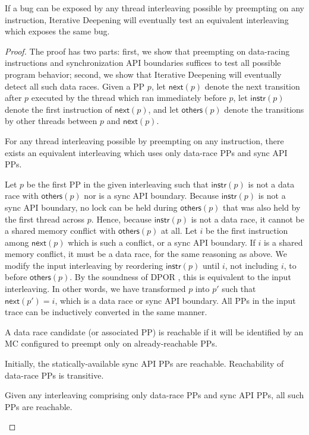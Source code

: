 \begin{theorem}
If a bug can be exposed by any thread interleaving possible by preempting on any instruction,
Iterative Deepening will eventually test an equivalent interleaving which exposes the same bug.
\end{theorem}
\begin{proof}
The proof has two parts:
first, we show that preempting on data-racing instructions and synchronization API boundaries suffices to test all possible program behavior;
second, we show that Iterative Deepening will eventually detect all such data races.
\newcommand\ppnext[1]{\ensuremath{\mathsf{next}(#1)}}
\newcommand\ppinstr[1]{\ensuremath{\mathsf{instr}(#1)}}
\newcommand\ppothers[1]{\ensuremath{\mathsf{others}(#1)}}
Given a PP $p$, let $\ppnext{p}$ denote the next transition after $p$ executed by the thread which ran immediately before $p$,
let $\ppinstr{p}$ denote the first instruction of $\ppnext{p}$,
and let $\ppothers{p}$ denote the transitions by other threads between $p$ and $\ppnext{p}$.

\begin{lemma}
For any thread interleaving possible by preempting on any instruction,
there exists an equivalent interleaving which uses only data-race PPs and sync API PPs.
	\label{lem:relevant}
\end{lemma}

Let $p$ be the first PP in the given interleaving such that $\ppinstr{p}$ is not a data race with $\ppothers{p}$ nor is a sync API boundary.
Because $\ppinstr{p}$ is not a sync API boundary,
no lock can be held during $\ppothers{p}$ that was also held by the first thread across $p$.
Hence, because $\ppinstr{p}$ is not a data race, it cannot be a shared memory conflict with $\ppothers{p}$ at all.
Let $i$ be the first instruction among $\ppnext{p}$ which is such a conflict, or a sync API boundary.
If $i$ is a shared memory conflict, it must be a data race, for the same reasoning as above.
We modify the input interleaving by reordering $\ppinstr{p}$ until $i$, not including $i$, to before $\ppothers{p}$.
By the soundness of DPOR \cite{dpor}, this is equivalent to the input interleaving.
In other words, we have transformed $p$ into $p'$ such that $\ppnext{p'} = i$, which is a data race or sync API boundary.
All PPs in the input trace can be inductively converted in the same manner.

\begin{definition}
A data race candidate (or associated PP) is reachable if it will be identified by an MC configured to preempt only on already-reachable PPs.
\end{definition}
Initially, the statically-available sync API PPs are reachable. Reachability of data-race PPs is transitive.
\begin{lemma}
	Given any interleaving comprising only data-race PPs and sync API PPs, all such PPs are reachable.
	\label{lem:saturation}
\end{lemma}


\end{proof}
